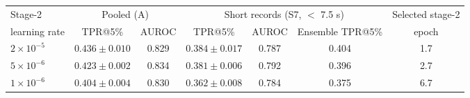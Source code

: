 \begin{tabular}{l c c c c c c}
\hline
Stage-2 & \multicolumn{2}{c}{Pooled (A)} & \multicolumn{3}{c}{Short records (S7, $<$ 7.5 s)} & Selected stage-2 \\
learning rate & TPR@5\% & AUROC & TPR@5\% & AUROC & Ensemble TPR@5\% & epoch \\
\hline
$2\times10^{-5}$ & $0.436 \pm 0.010$ & 0.829 & $0.384 \pm 0.017$ & 0.787 & 0.404 & 1.7 \\
$5\times10^{-6}$ & $0.423 \pm 0.002$ & 0.834 & $0.381 \pm 0.006$ & 0.792 & 0.396 & 2.7 \\
$1\times10^{-6}$ & $0.404 \pm 0.004$ & 0.830 & $0.362 \pm 0.008$ & 0.784 & 0.375 & 6.7 \\
\hline
\end{tabular}
